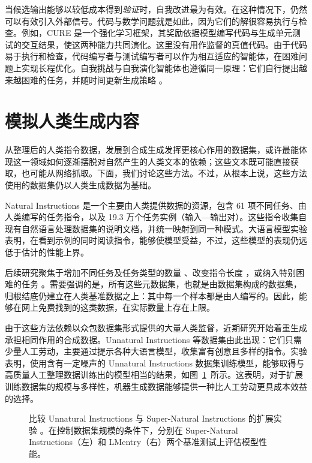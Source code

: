 当候选输出能够以较低成本得到{\em 验证}时，自我改进最为有效。在这种情况下，仍然可以有效引入外部信号。代码与数学问题就是如此，因为它们的解很容易执行与检查。例如，CURE 是一个强化学习框架，其奖励依据模型编写代码与生成单元测试的交互结果，使这两种能力共同演化。这里没有用作监督的真值代码。由于代码易于执行和检查，代码编写者与测试编写者可以作为相互适应的智能体，在困难问题上实现长程优化。自我挑战与自我演化智能体也遵循同一原理：它们自行提出越来越困难的任务，并随时间更新生成策略 \citep{NEURIPS2025_a5a305fa, huang2025r, NEURIPS2025_d38653cd}。




\section{模拟人类生成内容}
\label{sec:sim-hum}
从整理后的人类指令数据，发展到合成生成发挥更核心作用的数据集，或许最能体现这一领域如何逐渐摆脱对自然产生的人类文本的依赖；这些文本既可能直接获取，也可能从网络抓取。下面，我们讨论这些方法。不过，从根本上说，这些方法使用的数据集仍以人类生成数据为基础。

Natural Instructions \citep{mishra-etal-2022-cross} 是一个主要由人类提供数据的资源，包含 61 项不同任务、由人类编写的任务指令，以及 19.3 万个任务实例（输入—输出对）。这些指令收集自现有自然语言处理数据集的说明文档，并统一映射到同一种模式。大语言模型实验表明，在看到示例的同时阅读指令，能够使模型受益，不过，这些模型的表现仍远低于估计的性能上界。

后续研究聚焦于增加不同任务及任务类型的数量 \citep{wang-etal-2022-super}、改变指令长度 \citep{bach-etal-2022-promptsource}，或纳入特别困难的任务 \citep{srivastava2023beyond}。需要强调的是，所有这些元数据集，也就是由数据集构成的数据集，归根结底仍建立在人类基准数据之上：其中每一个样本都是由人编写的。因此，能够在网上免费找到的这类数据，在实际数量上存在上限。

由于这些方法依赖以众包数据集形式提供的大量人类监督，近期研究开始着重生成承担相同作用的合成数据。Unnatural Instructions \citep{honovich-etal-2023-unnatural} 等数据集由此出现：它们只需少量人工劳动，主要通过提示各种大语言模型，收集富有创意且多样的指令。实验表明，使用含有一定噪声的 Unnatural Instructions 数据集训练模型，能够取得与高质量人工整理数据训练出的模型相当的结果，如图~\ref{fig:unnatural}~所示。这表明，对于扩展训练数据集的规模与多样性，机器生成数据能够提供一种比人工劳动更具成本效益的选择。

\begin{figure}[tb]
    \centering
    
    \caption{比较 Unnatural Instructions 与 Super-Natural Instructions 的扩展实验 \citep{honovich-etal-2023-unnatural}。在控制数据集规模的条件下，分别在 Super-Natural Instructions（左）和 LMentry（右）两个基准测试上评估模型性能。}
    \label{fig:unnatural}
\end{figure}

